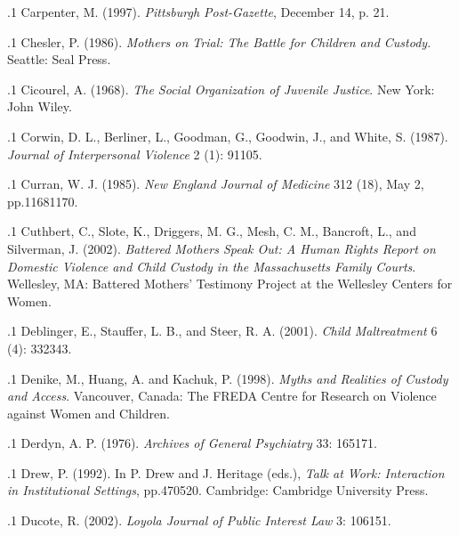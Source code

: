 \documentclass[11pt, twoside]{article}
\begin{document}
{\p.1{%
Carpenter, M. (1997).  \textit{Pittsburgh Post-Gazette},
December 14, p. 21.
}%

\p.1{%
Chesler, P. (1986). \textit{Mothers on Trial: The Battle for Children and Custody}. Seattle: Seal
Press.
}%

\p.1{%
Cicourel, A. (1968). \textit{The Social Organization of Juvenile Justice}. New York: John Wiley.
}%

\p.1{%
Corwin, D. L., Berliner, L., Goodman, G., Goodwin, J., and White, S. (1987).  \textit{Journal of Interpersonal
Violence} 2 (1): 91\ndash{}105.
}%

\p.1{%
Curran, W. J. (1985).  \textit{New England Journal of Medicine} 312 (18), May 2, pp.\@ 1168\ndash{}1170.
}%

\p.1{%
Cuthbert, C., Slote, K., Driggers, M. G., Mesh, C. M., Bancroft, L., and Silverman, J.
(2002). \textit{Battered Mothers Speak Out: A Human Rights Report on Domestic Violence
and Child Custody in the Massachusetts Family Courts}. Wellesley, MA: Battered
Mothers’ Testimony Project at the Wellesley Centers for Women.
}%

\p.1{%
Deblinger, E., Stauffer, L. B., and Steer, R. A. (2001).  \textit{Child Maltreatment}
6 (4): 332\ndash{}343.
}%

\p.1{%
Denike, M., Huang, A. and Kachuk, P. (1998). \textit{Myths and Realities of Custody and
Access}. Vancouver, Canada: The FREDA Centre for Research on Violence against
Women and Children.
}%

\p.1{%
Derdyn, A. P. (1976). 
\textit{Archives of General Psychiatry} 33: 165\ndash{}171.
}%

\p.1{%
Drew, P. (1992).  In P. Drew and J. Heritage (eds.), \textit{Talk at Work: Interaction in
Institutional Settings}, pp.\@ 470\ndash{}520. Cambridge: Cambridge University Press.
}%

\p.1{%
Ducote, R. (2002).  \textit{Loyola Journal of Public Interest Law} 3: 106\ndash{}151.
}%

}
\end{document}
